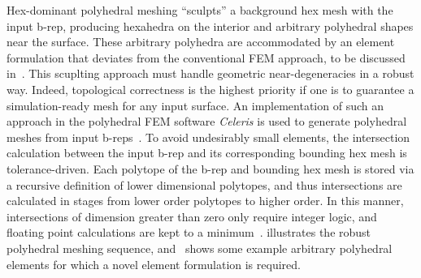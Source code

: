 Hex-dominant polyhedral meshing ``sculpts'' a background hex mesh with the input b-rep, producing hexahedra on the interior and arbitrary polyhedral shapes near the surface. These arbitrary polyhedra are accommodated by an element formulation that deviates from the conventional FEM approach, to be discussed in~. This scuplting approach must handle geometric near-degeneracies in a robust way. Indeed, topological correctness is the highest priority if one is to guarantee a simulation-ready mesh for any input surface. An implementation of such an approach in the polyhedral FEM software \textit{Celeris} is used to generate polyhedral meshes from input b-reps~\cite{rashid_2013}. To avoid undesirably small elements, the intersection calculation between the input b-rep and its corresponding bounding hex mesh is tolerance-driven. Each polytope of the b-rep and bounding hex mesh is stored via a recursive definition of lower dimensional polytopes, and thus intersections are calculated in stages from lower order polytopes to higher order. In this manner, intersections of dimension greater than zero only require integer logic, and floating point calculations are kept to a minimum~\cite{rashid_2013}.  illustrates the robust polyhedral meshing sequence, and~ shows some example arbitrary polyhedral elements for which a novel element formulation is required.

